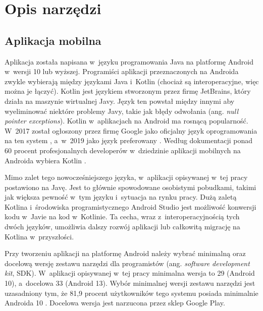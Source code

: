\documentclass[a4paper,twoside,12pt]{book}
\newcommand{\obcy}[1]{\emph{#1}}
\newcommand{\english}[1]{{\selectlanguage{british}\obcy{#1}}}
\begin{document}
\section{Opis narzędzi}

%
\subsection{Aplikacja mobilna}
Aplikacja została napisana w~języku programowania Java na platformę Android w~wersji 10 lub wyższej. Programiści aplikacji przeznaczonych na Androida zwykle wybierają między językami Java i~Kotlin (chociaż są interoperacyjne, więc można je łączyć). Kotlin jest językiem stworzonym przez firmę JetBrains, który działa na maszynie wirtualnej Javy. Język ten powstał między innymi aby wyeliminować niektóre problemy Javy, takie jak błędy odwołania (ang. \english{null pointer exceptions}). Kotlin w~aplikacjach na Android ma rosnącą popularność. W~2017 został ogłoszony przez firmę Google jako oficjalny język oprogramowania na ten system \cite{bib:internetKotlin17}, a~w~2019 jako język preferowany \cite{bib:internetKotlin19}. Według dokumentacji ponad 60 procent profesjonalnych developerów w~dziedzinie aplikacji mobilnych na Androida wybiera Kotlin \cite{bib:internetKotlin19}.

Mimo zalet tego nowocześniejszego języka, w~aplikacji opisywanej w~tej pracy postawiono na Javę. Jest to głównie spowodowane osobistymi pobudkami, takimi jak większa pewność w~tym języku i~sytuacja na rynku pracy. Dużą zaletą Kotlina i~środowiska programistycznego Android Studio jest możliwość konwersji kodu w~Javie na kod w~Kotlinie. Ta cecha, wraz z~interoperacyjnością tych dwóch języków, umożliwia dalszy rozwój aplikacji lub całkowitą migrację na Kotlina w~przyszłości. 

Przy tworzeniu aplikacji na platformę Android należy wybrać minimalną oraz docelową wersję zestawu narzędzi dla programistów (ang. \english{software development kit}, SDK). W~aplikacji opisywanej w~tej pracy minimalna wersja to 29 (Android 10), a~docelowa 33 (Android 13). Wybór minimalnej wersji zestawu narzędzi jest uzasadniony tym, że 81,9 procent użytkowników tego systemu posiada minimalnie Androida 10 \cite{bib:internetapilevels}. Docelowa wersja jest narzucona przez sklep Google Play. 
\end{document}
